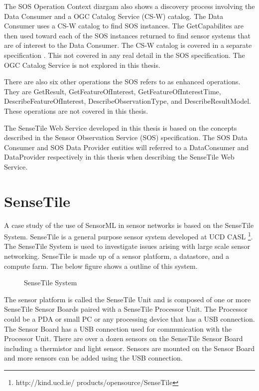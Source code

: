 \documentclass[]{final_report}
\begin{document}
The SOS Operation Context diargam also shows a discovery process involving the  Data Consumer and a OGC Catalog Service (CS-W) catalog. The Data Consumer uses a CS-W catalog to find SOS instances. The GetCapabilites are then used toward each of the SOS instances returned to find sensor systems that are of interest to the Data Consumer. The CS-W catalog is covered in a separate specification \cite{OGCcatref}. This not covered in any real detail in the SOS specification. The OGC Catalog Service is not explored in this thesis.

There are also six other operations the SOS refers to as enhanced operations. They are GetResult,
GetFeatureOfInterest, GetFeatureOfInterestTime, DescribeFeatureOfInterest,
DescribeObservationType, and DescribeResultModel. These operations are not covered in this thesis.

The SenseTile Web Service developed in this thesis is based on the concepts described in the Sensor Observation Service (SOS) specification. The SOS Data Consumer and SOS Data Provider entities will referred to a DataConsumer and DataProvider respectively in this thesis when describing the SenseTile Web Service.


\section{SenseTile}
A case study of the use of SensorML in sensor networks is based on the SenseTile System. SenseTile is a general purpose sensor system developed at UCD CASL \footnote{http://kind.ucd.ie/
products/opensource/SenseTile}. The SenseTile System is used to investigate issues arising with large scale sensor networking. SenseTile is made up of a sensor platform, a datastore, and a compute farm. The below figure shows a outline of this system. 
\begin{figure}[h]
\caption{SenseTile System}\label{fig:SenseTileDescription}
\end{figure}
 The sensor platform is called the SenseTile Unit and is composed of one or more SenseTile Sensor Boards paired with a SenseTile Processor Unit. The Processor could be a PDA or small PC or any processing device that has a USB connection.  The Sensor Board has a USB connection used for communication with the Processor Unit. There are over a dozen sensors on the SenseTile Sensor Board including a thermistor and light sensor. Sensors are mounted on the Sensor Board and more sensors can be added using the USB connection.
\end{document}
